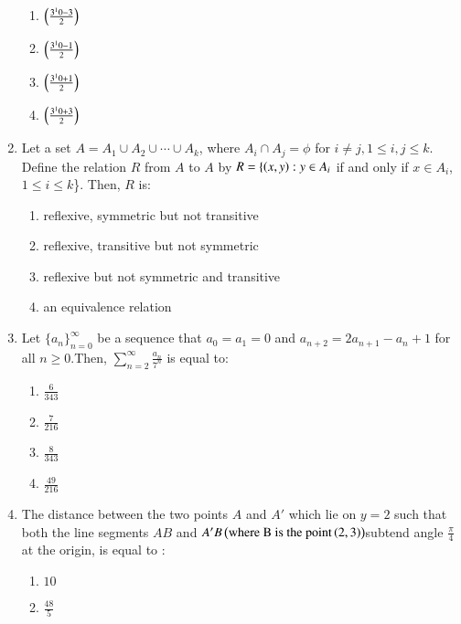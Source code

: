 \documentclass[journal,12pt,twocolumn]{IEEEtran}
\theoremstyle{remark}
\begin{document}
\begin{enumerate}
\begin{multicols}{2}
\begin{enumerate}
    \item $\left(\frac{3^10-3}{2}\right)$
    \item $\left(\frac{3^10-1}{2}\right)$
    \item $\left(\frac{3^10+1}{2}\right)$
    \item $\left(\frac{3^10+3}{2}\right)$
\end{enumerate}
\end{multicols}
\bigskip
\item Let a set $A=A_1 \cup A_2 \cup \cdots \cup A_k$, where $A_i \cap A_j=\phi$ for $i\neq j,1\leq i,j\leq k$. Define the relation $R$ from $A$ to $A$ by $R=\{\left(x,y\right):y\in A_i$ if and only if $x \in A_i$, $1\leq i \leq k$\}. Then, $R$ is:
\begin{multicols}{2}
\begin{enumerate}
    \item reflexive, symmetric but not transitive
    \item reflexive, transitive but not symmetric
    \item reflexive but not symmetric and transitive
    \item an equivalence relation 
\end{enumerate}
\end{multicols}
\bigskip
\item Let $\{a_n\}_{n=0}^{\infty}$ be a sequence that $a_0=a_1=0$ and $a_{n+2}=2a_{n+1}-a_n+1$ for all $n \geq 0$.Then, $\sum_{n=2}^{\infty}\frac{a_n}{7^n}$ is equal to: 
\begin{multicols}{2}
\begin{enumerate}
    \item $\frac{6}{343}$
    \item $\frac{7}{216}$
    \item $\frac{8}{343}$
    \item $\frac{49}{216}$
\end{enumerate}
\end{multicols}
\bigskip
\item The distance between the two points $A$ and $A'$ which lie on $y=2$ such that both the line segments $AB$ and $A'B\left(\text{where B is the point}\left(2,3\right)\right)$subtend angle $\frac{\pi}{4}$ at the origin, is equal to :
\begin{multicols}{2}
\begin{enumerate}
    \item $10$
    \item $\frac{48}{5}$

\end{enumerate}
\end{multicols}
\end{enumerate}
\end{document}
